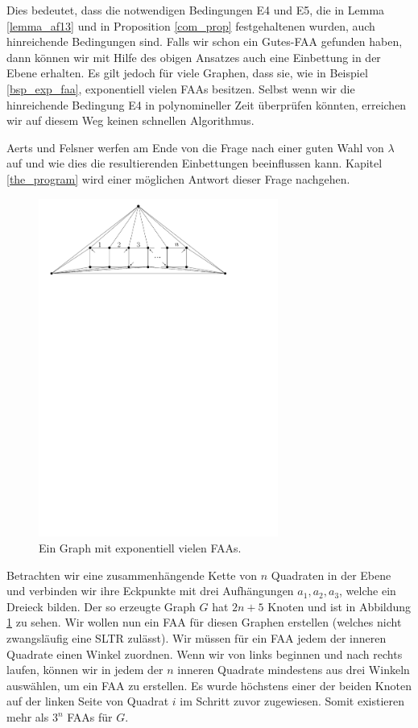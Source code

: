 \begin{remark}
Dies bedeutet, dass die notwendigen Bedingungen E4 und E5, die in Lemma \ref{lemma_af13} und in Proposition \ref{com_prop} festgehaltenen wurden, auch hinreichende Bedingungen sind. Falls wir schon ein Gutes-FAA gefunden haben, dann können wir mit Hilfe des obigen Ansatzes auch eine Einbettung in der Ebene erhalten. Es gilt jedoch für viele Graphen, dass sie, wie in Beispiel \ref{bsp_exp_faa}, exponentiell vielen FAAs besitzen. Selbst wenn wir die hinreichende Bedingung E4 in polynomineller Zeit überprüfen könnten, erreichen wir auf diesem Weg keinen schnellen Algorithmus.
\end{remark}

Aerts und Felsner werfen am Ende von \cite{af13} die Frage nach einer guten Wahl von $\lambda$ auf und wie dies die resultierenden Einbettungen beeinflussen kann. Kapitel \ref{the_program} wird einer möglichen Antwort dieser Frage nachgehen.

\begin{figure}
	\centering
  \includegraphics[width=0.7\textwidth]{exp_faa.pdf}
  \caption{Ein Graph mit exponentiell vielen FAAs.}
  \label{exp_faa_pic}
\end{figure}

\begin{example}\label{bsp_exp_faa}
Betrachten wir eine zusammenhängende Kette von $n$ Quadraten in der Ebene und verbinden wir ihre Eckpunkte mit drei Aufhängungen $a_1,a_2,a_3$, welche ein Dreieck bilden. Der so erzeugte Graph $G$ hat $2n+5$ Knoten und ist in Abbildung \ref{exp_faa_pic} zu sehen. Wir wollen nun ein FAA für diesen Graphen erstellen (welches nicht zwangsläufig eine SLTR zulässt). Wir müssen für ein FAA jedem der inneren Quadrate einen Winkel zuordnen. Wenn wir von links beginnen und nach rechts laufen, können wir in jedem der $n$ inneren Quadrate mindestens aus drei Winkeln auswählen, um ein FAA zu erstellen. Es wurde höchstens einer der beiden Knoten auf der linken Seite von Quadrat $i$ im Schritt zuvor zugewiesen. Somit existieren mehr als $3^n$ FAAs für $G.$
\end{example}
